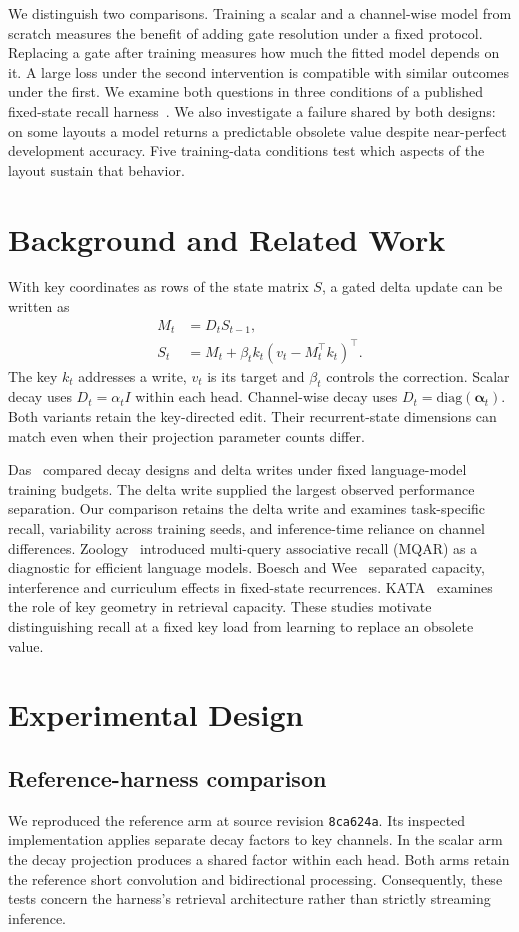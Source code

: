 \documentclass[conference]{IEEEtran}
\begin{document}
We distinguish two comparisons. Training a scalar and a channel-wise model from scratch measures the benefit of adding gate resolution under a fixed protocol. Replacing a gate after training measures how much the fitted model depends on it. A large loss under the second intervention is compatible with similar outcomes under the first. We examine both questions in three conditions of a published fixed-state recall harness~\cite{anatomy}. We also investigate a failure shared by both designs: on some layouts a model returns a predictable obsolete value despite near-perfect development accuracy. Five training-data conditions test which aspects of the layout sustain that behavior.
\section{Background and Related Work}
With key coordinates as rows of the state matrix $S$, a gated delta update can be written as
\begin{align}
M_t &= D_t S_{t-1},\\
S_t &= M_t+\beta_t k_t(v_t-M_t^\top k_t)^\top .
\end{align}
The key $k_t$ addresses a write, $v_t$ is its target and $\beta_t$ controls the correction. Scalar decay uses $D_t=\alpha_t I$ within each head. Channel-wise decay uses $D_t=\mathrm{diag}(\boldsymbol{\alpha}_t)$. Both variants retain the key-directed edit. Their recurrent-state dimensions can match even when their projection parameter counts differ.

Das~\cite{das} compared decay designs and delta writes under fixed language-model training budgets. The delta write supplied the largest observed performance separation. Our comparison retains the delta write and examines task-specific recall, variability across training seeds, and inference-time reliance on channel differences. Zoology~\cite{zoo} introduced multi-query associative recall (MQAR) as a diagnostic for efficient language models. Boesch and Wee~\cite{anatomy} separated capacity, interference and curriculum effects in fixed-state recurrences. KATA~\cite{kata} examines the role of key geometry in retrieval capacity. These studies motivate distinguishing recall at a fixed key load from learning to replace an obsolete value.
\section{Experimental Design}
\subsection{Reference-harness comparison}
We reproduced the reference arm at source revision \texttt{8ca624a}. Its inspected implementation applies separate decay factors to key channels. In the scalar arm the decay projection produces a shared factor within each head. Both arms retain the reference short convolution and bidirectional processing. Consequently, these tests concern the harness's retrieval architecture rather than strictly streaming inference.
\end{document}
